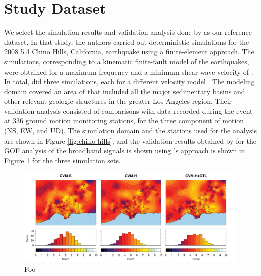 
\section{Study Dataset}

We select the simulation results and validation analysis done by \citet{Taborda_2014_BSSA} as our reference dataset. In that study, the authors carried out deterministic simulations for the 2008  5.4 Chino Hills, California, earthquake using a finite-element approach. The simulations, corresponding to a kinematic finite-fault model of the earthquakes, were obtained for a maximum frequency  and a minimum shear wave velocity of . In total, \citet{Taborda_2014_BSSA} did three simulations, each for a different velocity model \citep[CVM-S4, CVM-H, CVM-H+GTL,][]{Small_2017_SRL}. The modeling domain covered an area of  that included all the major sedimentary basins and other relevant geologic structures in the greater Los Angeles region. Their validation analysis consisted of comparisons with data recorded during the event at 336 ground motion monitoring stations, for the three component of motion (NS, EW, and UD). The simulation domain and the stations used for the analysis are shown in Figure \ref{fig:chino-hills}, and the validation results obtained by \citet{Taborda_2014_BSSA} for the GOF analysis of the broadband signals is shown using \citeauthor{Anderson_2004_Proc}'s approach is shown in Figure \ref{fig:ref-gof-maps} for the three simulation sets.

\begin{figure}
    \centering
    \includegraphics[width=\textwidth]{figures/pdf/figure-02}
    \caption{Foo}
    \label{fig:ref-gof-maps}
\end{figure}

